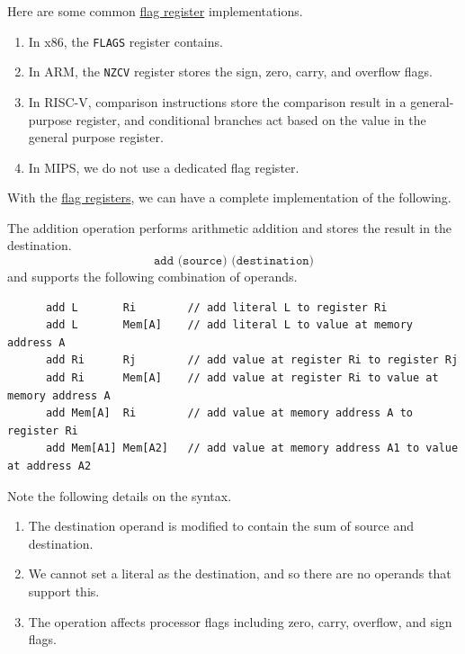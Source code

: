   \begin{example}
    \label{ex:flag-registers-in-x86-and-arm}
    Here are some common \hyperref[def:flag-register]{flag register} implementations.
    \begin{enumerate}
      \item In x86, the \texttt{FLAGS} register contains. 
      \item In ARM, the \texttt{NZCV} register stores the sign, zero, carry, and overflow flags. 
      \item In RISC-V, comparison instructions store the comparison result in a general-purpose register, and conditional branches act based on the value in the general purpose register. 
      \item In MIPS, we do not use a dedicated flag register. 
    \end{enumerate}
  \end{example}
  
  With the \hyperref[def:flag-register]{flag registers}, we can have a complete implementation of the following. 

  \begin{definition}[Addition]
    \label{def:addition}
    The addition operation performs arithmetic addition and stores the result in the destination.
    \begin{equation}
      \texttt{add (source) (destination)}
    \end{equation}
    and supports the following combination of operands.
    \begin{lstlisting}
      add L       Ri        // add literal L to register Ri
      add L       Mem[A]    // add literal L to value at memory address A
      add Ri      Rj        // add value at register Ri to register Rj
      add Ri      Mem[A]    // add value at register Ri to value at memory address A
      add Mem[A]  Ri        // add value at memory address A to register Ri
      add Mem[A1] Mem[A2]   // add value at memory address A1 to value at address A2
    \end{lstlisting}
    Note the following details on the syntax.
    \begin{enumerate}
      \item The destination operand is modified to contain the sum of source and destination.
      \item We cannot set a literal as the destination, and so there are no operands that support this.
      \item The operation affects processor flags including zero, carry, overflow, and sign flags.
    \end{enumerate}
  \end{definition}

